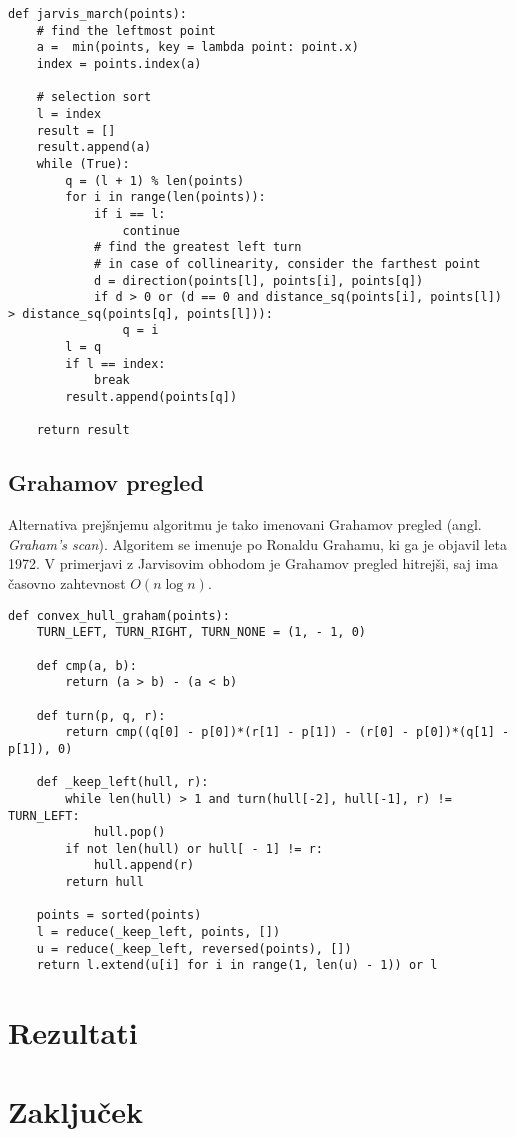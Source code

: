 \documentclass[a4paper]{article}
\begin{document}
\begin{lstlisting}
def jarvis_march(points):
    # find the leftmost point
    a =  min(points, key = lambda point: point.x)
    index = points.index(a)
    
    # selection sort
    l = index
    result = []
    result.append(a)
    while (True):
        q = (l + 1) % len(points)
        for i in range(len(points)):
            if i == l:
                continue
            # find the greatest left turn
            # in case of collinearity, consider the farthest point
            d = direction(points[l], points[i], points[q])
            if d > 0 or (d == 0 and distance_sq(points[i], points[l]) > distance_sq(points[q], points[l])):
                q = i
        l = q
        if l == index:
            break
        result.append(points[q])

    return result
\end{lstlisting}


\subsection{Grahamov pregled}
Alternativa prejšnjemu algoritmu je tako imenovani Grahamov pregled (angl. \textit{Graham's scan}). Algoritem se imenuje po Ronaldu Grahamu, ki ga je objavil leta 1972. V primerjavi z Jarvisovim obhodom je Grahamov pregled hitrejši, saj ima časovno zahtevnost $O(n \log n)$.

\begin{lstlisting}
def convex_hull_graham(points):
    TURN_LEFT, TURN_RIGHT, TURN_NONE = (1, - 1, 0)

    def cmp(a, b):
        return (a > b) - (a < b)

    def turn(p, q, r):
        return cmp((q[0] - p[0])*(r[1] - p[1]) - (r[0] - p[0])*(q[1] - p[1]), 0)

    def _keep_left(hull, r):
        while len(hull) > 1 and turn(hull[-2], hull[-1], r) != TURN_LEFT:
            hull.pop()
        if not len(hull) or hull[ - 1] != r:
            hull.append(r)
        return hull

    points = sorted(points)
    l = reduce(_keep_left, points, [])
    u = reduce(_keep_left, reversed(points), [])
    return l.extend(u[i] for i in range(1, len(u) - 1)) or l
\end{lstlisting}





\section{Rezultati}

\section{Zaključek}
\end{document}
